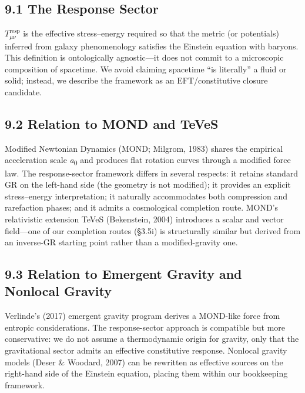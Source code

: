 \subsection{9.1 The Response Sector}\label{the-response-sector}

\(T_{\mu\nu}^{\text{resp}}\) is the effective stress--energy required so that the metric (or potentials) inferred from galaxy phenomenology satisfies the Einstein equation with baryons. This definition is ontologically agnostic---it does not commit to a microscopic composition of spacetime. We avoid claiming spacetime ``is literally'' a fluid or solid; instead, we describe the framework as an EFT/constitutive closure candidate.

\subsection{9.2 Relation to MOND and TeVeS}\label{relation-to-mond-and-teves}

Modified Newtonian Dynamics (MOND; Milgrom, 1983) shares the empirical acceleration scale \emph{a}\textsubscript{0} and produces flat rotation curves through a modified force law. The response-sector framework differs in several respects: it retains standard GR on the left-hand side (the geometry is not modified); it provides an explicit stress--energy interpretation; it naturally accommodates both compression and rarefaction phases; and it admits a cosmological completion route. MOND's relativistic extension TeVeS (Bekenstein, 2004) introduces a scalar and vector field---one of our completion routes (§3.5i) is structurally similar but derived from an inverse-GR starting point rather than a modified-gravity one.

\subsection{9.3 Relation to Emergent Gravity and Nonlocal Gravity}\label{relation-to-emergent-gravity-and-nonlocal-gravity}

Verlinde's (2017) emergent gravity program derives a MOND-like force from entropic considerations. The response-sector approach is compatible but more conservative: we do not assume a thermodynamic origin for gravity, only that the gravitational sector admits an effective constitutive response. Nonlocal gravity models (Deser \& Woodard, 2007) can be rewritten as effective sources on the right-hand side of the Einstein equation, placing them within our bookkeeping framework.


